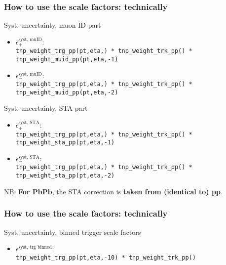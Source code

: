 \documentclass[9pt]{beamer}
\begin{document}
 
  \begin{frame}[plain]
  \frametitle{How to use the scale factors: technically}
  
    \begin{block}{Syst. uncertainty, muon ID part}
  \begin{itemize}
   \item \alert{$\epsilon^\text{syst, muID}_{+}$}: \\\texttt{tnp\_weight\_trg\_pp(pt,eta,) * tnp\_weight\_trk\_pp() * tnp\_weight\_\alert{muid}\_pp(pt,eta,\alert{-1})}
   
   \item \alert{$\epsilon^\text{syst, muID}_{-}$}: \\\texttt{tnp\_weight\_trg\_pp(pt,eta,) * tnp\_weight\_trk\_pp() * tnp\_weight\_\alert{muid}\_pp(pt,eta,\alert{-2})}
   \end{itemize}
  \end{block}
  
  \begin{block}{Syst. uncertainty, STA part}
  \begin{itemize}
   \item \alert{$\epsilon^\text{syst, STA}_{+}$}: \\\texttt{tnp\_weight\_trg\_pp(pt,eta,) * tnp\_weight\_trk\_pp() * tnp\_weight\_\alert{sta}\_pp(pt,eta,\alert{-1})}
   
   \item \alert{$\epsilon^\text{syst, STA}_{-}$}: \\\texttt{tnp\_weight\_trg\_pp(pt,eta,) * tnp\_weight\_trk\_pp() * tnp\_weight\_\alert{sta}\_pp(pt,eta,\alert{-2})}
   \end{itemize}
   
   \footnotesize \alert{NB}: \textbf{For PbPb}, the STA correction is \textbf{taken from (identical to) pp}.
  \end{block}

 \end{frame}
 
  \begin{frame}[plain]
  \frametitle{How to use the scale factors: technically}
  
  \begin{block}{Syst. uncertainty, binned trigger scale factors}
  \begin{itemize}
   \item \alert{$\epsilon^\text{syst, trg binned}$}: \\\texttt{tnp\_weight\_trg\_pp(pt,eta,\alert{-10}) * tnp\_weight\_trk\_pp()}
   \end{itemize}
  \end{block}
 \end{frame}
 
\end{document}
